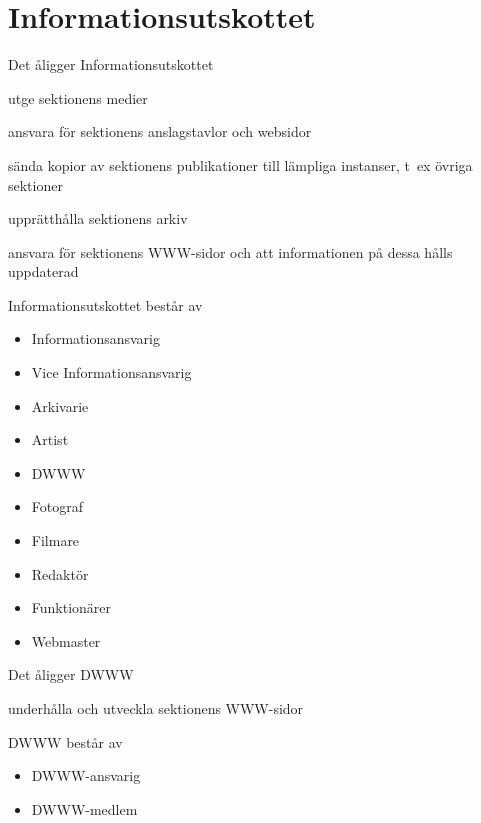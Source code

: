 \documentclass[pdfbookmarks,a4paper,11pt]{article}
\newlength{\itemcollength}
\newenvironment{reglemlista}{%
  \begin{list}{}{%
      \setlength{\labelwidth}{\itemcollength}%
      \setlength{\leftmargin}{\labelwidth + \labelsep}%
      \renewcommand{\makelabel}[1]{%
        \raisebox{0pt}[1ex][0pt]{%
          \makebox[\labelwidth][l]{%
            \parbox[t]{\itemcollength}{%
              \raggedright\hspace{0pt}##1}}}\hfill}%
      }}{%
  \end{list}}
\begin{document}
\section{Informationsutskottet}

\begin{reglemlista}

	\item[Åligganden]
	Det åligger Informationsutskottet
	\begin{attlista}
		\item utge sektionens medier
		\item ansvara för sektionens anslagstavlor och websidor
		\item sända kopior av sektionens publikationer till lämpliga instanser, t~ex övriga sektioner
		\item upprätthålla sektionens arkiv
		\item ansvara för sektionens WWW-sidor och att informationen på dessa hålls uppdaterad
	\end{attlista}

	\item[Sammansättning]
	Informationsutskottet består av
	\begin{itemize}
		\item Informationsansvarig
		\item Vice Informationsansvarig
		\item Arkivarie
		\item Artist
		\item DWWW
		\item Fotograf
		\item Filmare
        \item Redaktör
		\item Funktionärer
		\item Webmaster
	\end{itemize}

	\item[\textbf{DWWW}]

	\item[Åligganden]
	Det åligger DWWW
	\begin{attlista}
		\item underhålla och utveckla sektionens WWW-sidor
	\end{attlista}

	\item[Sammansättning]
	DWWW består av
	\begin{itemize}
		\item DWWW-ansvarig
		\item DWWW-medlem
	\end{itemize}

\end{reglemlista}
\end{document}
